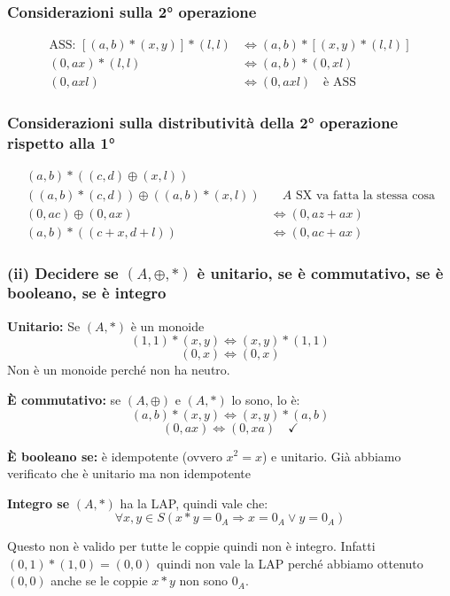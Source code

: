 \subsubsection*{Considerazioni sulla 2° operazione}

\begin{align*}
\text{ASS: } [(a,b) * (x,y)] * (l,l) &\Leftrightarrow (a,b) * [(x,y) * (l,l)] \\
(0, ax) * (l,l) &\Leftrightarrow (a,b) * (0, xl) \\
(0, axl) &\Leftrightarrow (0, axl) \quad \text{è ASS}
\end{align*}

\subsubsection*{Considerazioni sulla distributività della 2° operazione rispetto alla 1°}

\begin{align*}
(a,b) * ((c,d) \oplus (x,l)) \\
((a,b) * (c,d)) \oplus ((a,b) * (x,l)) &\quad A \text{ SX va fatta la stessa cosa} \\
(0, ac) \oplus (0, ax) &\Leftrightarrow (0, az + ax) \\
(a,b) * ((c+x, d+l)) &\Leftrightarrow (0, ac + ax)
\end{align*}


\subsubsection*{(ii) Decidere se $(A, \oplus, *)$ è unitario, se è commutativo, se è booleano, se è integro}

\textbf{Unitario:} Se $(A,*)$ è un monoide
$$(1,1) * (x,y) \Leftrightarrow (x,y) * (1,1)$$
$$(0,x) \Leftrightarrow (0,x)$$
Non è un monoide perché non ha neutro.

\textbf{È commutativo:} se $(A,\oplus)$ e $(A,*)$ lo sono, lo è:
$$(a,b) * (x,y) \Leftrightarrow (x,y) * (a,b)$$
$$(0,ax) \Leftrightarrow (0,xa) \quad \checkmark$$

\textbf{È booleano se:} è idempotente (ovvero $x^2 = x$) e unitario. Già abbiamo verificato che è unitario ma non idempotente

\textbf{Integro se} $(A,*)$ ha la LAP, quindi vale che:
$$\forall x, y \in S (x * y = 0_A \Rightarrow x = 0_A \lor y = 0_A)$$

Questo non è valido per tutte le coppie quindi non è integro. Infatti $(0,1) * (1,0) = (0,0)$ quindi non vale la LAP perché abbiamo ottenuto $(0,0)$ anche se le coppie $x*y$ non sono $0_A$.

